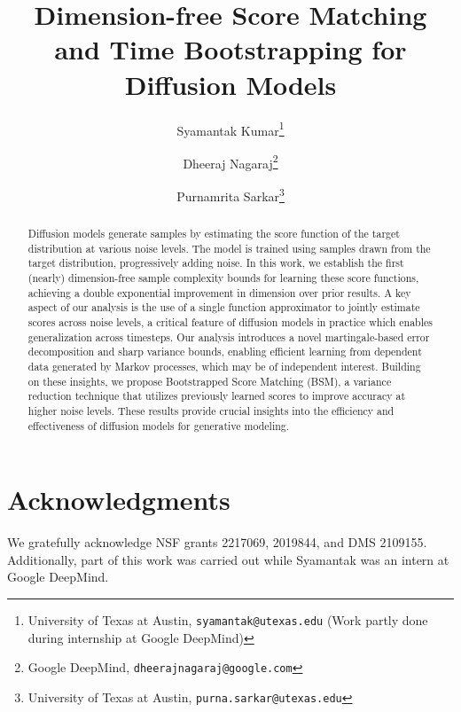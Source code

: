 \documentclass[11pt]{article}
\title{Dimension-free Score Matching and Time Bootstrapping for Diffusion Models}
\author{Syamantak Kumar\thanks{University of Texas at Austin, \texttt{syamantak@utexas.edu} (Work partly done during internship at Google DeepMind)} 
\and Dheeraj Nagaraj\thanks{Google DeepMind, \texttt{dheerajnagaraj@google.com}}
\and Purnamrita Sarkar\thanks{University of Texas at Austin, \texttt{purna.sarkar@utexas.edu}}}
\begin{document}
\maketitle

\begin{abstract}
Diffusion models generate samples by estimating the score function of the target distribution at various noise levels. The model is trained using samples drawn from the target distribution, progressively adding noise. In this work, we establish the first (nearly) dimension-free sample complexity bounds for learning these score functions, achieving a double exponential improvement in dimension over prior results. A key aspect of our analysis is the use of a single function approximator to jointly estimate scores across noise levels, a critical feature of diffusion models in practice which enables generalization across timesteps. Our analysis introduces a novel martingale-based error decomposition and sharp variance bounds, enabling efficient learning from dependent data generated by Markov processes, which may be of independent interest. Building on these insights, we propose Bootstrapped Score Matching (BSM), a variance reduction technique that utilizes previously learned scores to improve accuracy at higher noise levels. These results provide crucial insights into the efficiency and effectiveness of diffusion models for generative modeling.
\end{abstract}
\thispagestyle{empty}
\newpage
\tableofcontents
\thispagestyle{empty}
\newpage









\section*{Acknowledgments}
We gratefully acknowledge NSF grants 2217069, 2019844, and DMS 2109155. Additionally, part of this work was carried out while Syamantak was an intern at Google DeepMind.

\clearpage




\newpage
\onecolumn

\end{document}
